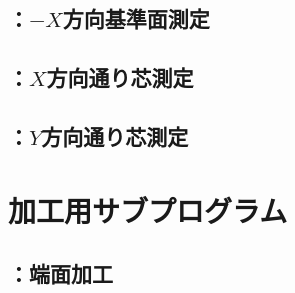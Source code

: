 \clearpage
\subsection{\MXface：$-X$方向基準面測定}



\clearpage
\subsection{\MXcenterline：$X$方向通り芯測定}



\clearpage
\subsection{\MYcenterline：$Y$方向通り芯測定}




\clearpage
\section{加工用サブプログラム}


\subsection{\KRecRight：端面加工}



\clearpage
